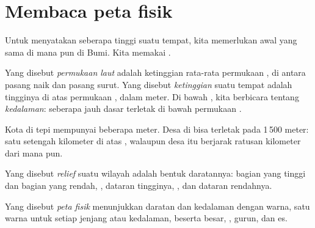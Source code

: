 \section{Membaca peta fisik}

Untuk menyatakan seberapa tinggi suatu tempat, kita memerlukan 
awal yang sama di mana pun di Bumi. Kita memakai  .

\begin{definition}\label{def:g4:world-physical-map:altitude}
Yang disebut \emph{permukaan laut} adalah ketinggian
rata-rata permukaan , di antara pasang naik dan pasang surut. Yang
disebut \emph{ketinggian} suatu tempat adalah tingginya di
atas permukaan , dalam meter. Di bawah , kita berbicara tentang
\emph{kedalaman}: seberapa jauh dasar  terletak di bawah permukaan .
\end{definition}

Kota di tepi  mempunyai  beberapa meter. Desa di 
bisa terletak pada 1\,500 meter: satu setengah kilometer di atas , walaupun desa itu berjarak ratusan kilometer dari  mana pun.

\begin{definition}[Relief]\label{def:g4:world-physical-map:relief}
Yang disebut \emph{relief} suatu wilayah adalah bentuk
daratannya: bagian yang tinggi dan bagian yang rendah, ,
dataran tingginya, , dan dataran rendahnya.
\end{definition}

\begin{definition}\label{def:g4:world-physical-map:physical-map}
Yang disebut \emph{peta fisik} menunjukkan  daratan
dan kedalaman  dengan warna, satu warna untuk setiap jenjang 
atau kedalaman, beserta  besar, , gurun, dan es.
\end{definition}

